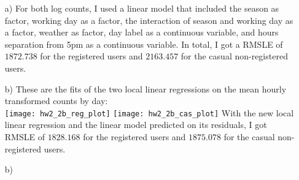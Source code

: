 \documentclass[11pt]{article}
\theoremstyle{definition}
\begin{document}
\begin{itemize}
        \begin{itemize}
            \item[a)]
                For both log counts, I used a linear model that included the season as factor, working day as a factor, the interaction of season and working day as a factor, weather as factor, day label as a continuous variable, and hours separation from 5pm as a continuous variable. In total, I got a RMSLE of $1872.738$ for the registered users and $2163.457$ for the casual non-registered users.
            \item[b)]
                These are the fits of the two local linear regressions on the mean hourly transformed counts by day: \\
                \texttt{[image: hw2\_2b\_reg\_plot]}
                \texttt{[image: hw2\_2b\_cas\_plot]}
                With the new local linear regression and the linear model predicted on its residuals, I got RMSLE of $1828.168$ for the registered users and $1875.078$ for the casual non-registered users.
            \item[b)]


\end{itemize}
\end{itemize}
\end{document}
